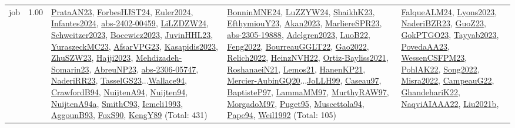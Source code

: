 {\begin{longtable}{p{3cm}r>{\raggedright\arraybackslash}p{6cm}>{\raggedright\arraybackslash}p{6cm}>{\raggedright\arraybackslash}p{8cm}}
\index{job}\index{Scheduling!job}job &  1.00 & \hyperref[detail:PrataAN23]{PrataAN23}, \hyperref[detail:ForbesHJST24]{ForbesHJST24}, \hyperref[detail:Euler2024]{Euler2024}, \hyperref[detail:Infantes2024]{Infantes2024}, \hyperref[detail:abs-2402-00459]{abs-2402-00459}, \hyperref[detail:LiLZDZW24]{LiLZDZW24}, \hyperref[detail:Schweitzer2023]{Schweitzer2023}, \hyperref[detail:Bocewicz2023]{Bocewicz2023}, \hyperref[detail:JuvinHHL23]{JuvinHHL23}, \hyperref[detail:YuraszeckMC23]{YuraszeckMC23}, \hyperref[detail:AfsarVPG23]{AfsarVPG23}, \hyperref[detail:Kasapidis2023]{Kasapidis2023}, \hyperref[detail:ZhuSZW23]{ZhuSZW23}, \hyperref[detail:Hajji2023]{Hajji2023}, \hyperref[detail:Mehdizadeh-Somarin23]{Mehdizadeh-Somarin23}, \hyperref[detail:AbreuNP23]{AbreuNP23}, \hyperref[detail:abs-2306-05747]{abs-2306-05747}, \hyperref[detail:NaderiRR23]{NaderiRR23}, \hyperref[detail:TasselGS23]{TasselGS23}...\hyperref[detail:Wallace94]{Wallace94}, \hyperref[detail:CrawfordB94]{CrawfordB94}, \hyperref[detail:NuijtenA94]{NuijtenA94}, \hyperref[detail:Nuijten94]{Nuijten94}, \hyperref[detail:NuijtenA94a]{NuijtenA94a}, \hyperref[detail:SmithC93]{SmithC93}, \hyperref[detail:Icmeli1993]{Icmeli1993}, \hyperref[detail:AggounB93]{AggounB93}, \hyperref[detail:FoxS90]{FoxS90}, \hyperref[detail:KengY89]{KengY89} (Total: 431) & \hyperref[detail:BonninMNE24]{BonninMNE24}, \hyperref[detail:LuZZYW24]{LuZZYW24}, \hyperref[detail:ShaikhK23]{ShaikhK23}, \hyperref[detail:EfthymiouY23]{EfthymiouY23}, \hyperref[detail:Akan2023]{Akan2023}, \hyperref[detail:MarliereSPR23]{MarliereSPR23}, \hyperref[detail:abs-2305-19888]{abs-2305-19888}, \hyperref[detail:Adelgren2023]{Adelgren2023}, \hyperref[detail:LuoB22]{LuoB22}, \hyperref[detail:Feng2022]{Feng2022}, \hyperref[detail:BourreauGGLT22]{BourreauGGLT22}, \hyperref[detail:Gao2022]{Gao2022}, \hyperref[detail:Relich2022]{Relich2022}, \hyperref[detail:HeinzNVH22]{HeinzNVH22}, \hyperref[detail:Ortiz-Bayliss2021]{Ortiz-Bayliss2021}, \hyperref[detail:RoshanaeiN21]{RoshanaeiN21}, \hyperref[detail:Lemos21]{Lemos21}, \hyperref[detail:HanenKP21]{HanenKP21}, \hyperref[detail:Mercier-AubinGQ20]{Mercier-AubinGQ20}...\hyperref[detail:JoLLH99]{JoLLH99}, \hyperref[detail:Caseau97]{Caseau97}, \hyperref[detail:BaptisteP97]{BaptisteP97}, \hyperref[detail:LammaMM97]{LammaMM97}, \hyperref[detail:MurthyRAW97]{MurthyRAW97}, \hyperref[detail:MorgadoM97]{MorgadoM97}, \hyperref[detail:Puget95]{Puget95}, \hyperref[detail:Muscettola94]{Muscettola94}, \hyperref[detail:Pape94]{Pape94}, \hyperref[detail:Weil1992]{Weil1992} (Total: 105) & \hyperref[detail:FalqueALM24]{FalqueALM24}, \hyperref[detail:Lyons2023]{Lyons2023}, \hyperref[detail:NaderiBZR23]{NaderiBZR23}, \hyperref[detail:GuoZ23]{GuoZ23}, \hyperref[detail:GokPTGO23]{GokPTGO23}, \hyperref[detail:Tayyab2023]{Tayyab2023}, \hyperref[detail:PovedaAA23]{PovedaAA23}, \hyperref[detail:WessenCSFPM23]{WessenCSFPM23}, \hyperref[detail:PohlAK22]{PohlAK22}, \hyperref[detail:Song2022]{Song2022}, \hyperref[detail:Misra2022]{Misra2022}, \hyperref[detail:CampeauG22]{CampeauG22}, \hyperref[detail:GhandehariK22]{GhandehariK22}, \hyperref[detail:NaqviAIAAA22]{NaqviAIAAA22}, \hyperref[detail:Liu2021b]{Liu2021b}, 
\end{longtable}}
